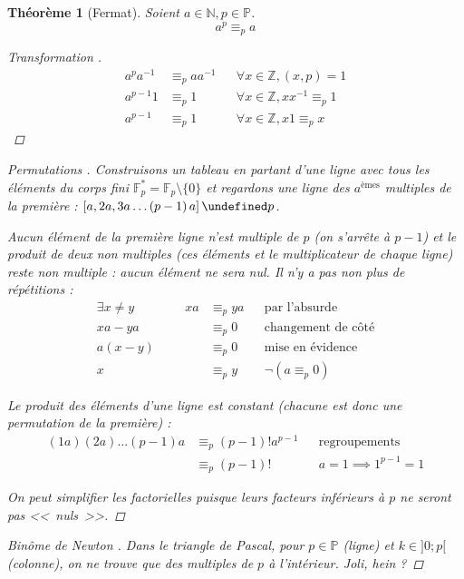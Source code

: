 \documentclass[11pt,twocolumn]{article}
\let\mod\undefined
\DeclareMathOperator{\mod}{mod}
\theoremstyle{plain}
\newtheorem{thm}{Théorème}
\newcommand{\esP}{\mathbb{P}} %
\newcommand{\esN}{\mathbb{N}} %
\newcommand{\esZ}{\mathbb{Z}} %
\newcommand{\esF}{\mathbb{F}} %
\begin{document}
\begin{thm}[Fermat]
	Soient $a \in \esN, p \in \esP$. \[
		a^p \equiv_p a
	\]
	\begin{proof}[Transformation \cite{Gillis}]
		\begin{align*}
			a^pa^{-1} & \equiv_p aa^{-1} && \forall x \in \esZ, (x,p)=1 \\
			a^{p-1}1 & \equiv_p 1 && \forall x \in \esZ, xx^{-1} \equiv_p 1 \\
			a^{p-1} & \equiv_p 1 && \forall x \in \esZ, x1 \equiv_p x
		\end{align*}
	\end{proof}
	\begin{proof}[Permutations \cite{Buys}]
		Construisons un tableau en partant d'une ligne avec tous les éléments
		du corps fini $\esF_p^* = \esF_p \setminus \{0\}$ et regardons une
		ligne des $a^{\text{èmes}}$ multiples de la première :
		$\left[a, 2a, 3a \dots \left(p-1\right)a\right] \mod p$.

		Aucun élément de la première ligne n'est multiple de $p$ (on s'arrête à
		$p-1$) et le produit de deux non multiples (ces éléments et le
		multiplicateur de chaque ligne) reste non multiple : aucun élément ne
		sera nul. Il n'y a pas non plus de répétitions :
		\begin{align*}
			\exists x \neq y \qquad\qquad
			xa & \equiv_p ya && \text{par l'absurde} \\
			xa - ya & \equiv_p 0 && \text{changement de côté} \\
			a \left(x - y\right) & \equiv_p 0 && \text{mise en évidence} \\
			x & \equiv_p y && \lnot \left(a \equiv_p 0\right)
		\end{align*}

		Le produit des éléments d'une ligne est constant (chacune est donc une
		permutation de la première) :
		\begin{align*}
			(1a)(2a)\dots\left(p-1\right)a
			& \equiv_p \left(p-1\right)!a^{p-1} && \text{regroupements} \\
			& \equiv_p \left(p-1\right)! && a=1 \implies 1^{p-1} = 1
		\end{align*}

		On peut simplifier les factorielles puisque
		leurs facteurs inférieurs à $p$ ne seront pas <<~nuls~>>.
	\end{proof}
	\begin{proof}[Binôme de Newton \cite{Buys}]
		Dans le triangle de Pascal, pour $p \in \esP$ (ligne) et
		$k \in ]0;p[$ (colonne), on ne trouve que des multiples de $p$
		à l'intérieur. \emph{Joli, hein ?}


\end{proof}
\end{thm}
\end{document}
